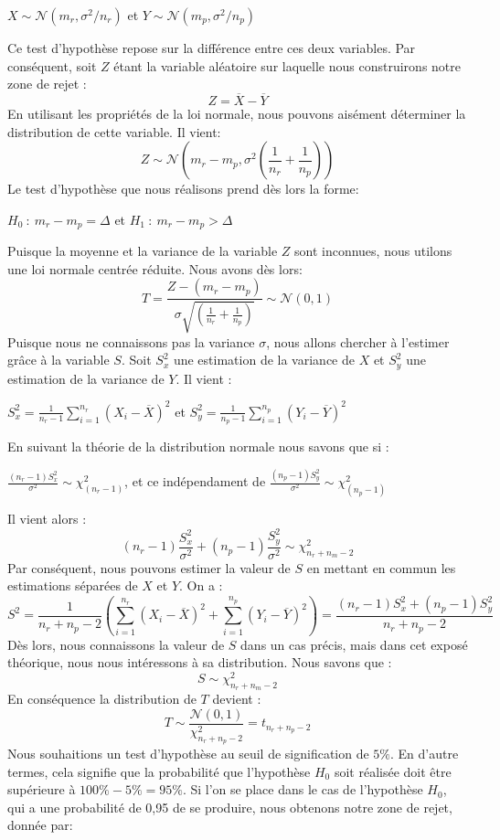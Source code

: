 \documentclass[a4paper, 11pt]{article}
\begin{document}
\begin{enumerate}[label=(\alph*)]
\begin{center}
    $X\sim\mathcal{N}(m_r,\sigma^2/n_r)$ et $Y\sim\mathcal{N}(m_p,\sigma^2/n_p)$
\end{center}
Ce test d'hypothèse repose sur la différence entre ces deux variables. Par conséquent, soit $Z$ étant la variable aléatoire sur laquelle nous construirons notre zone de rejet :
$$Z=\overline{X}-\overline{Y}$$
En utilisant les propriétés de la loi normale, nous pouvons aisément déterminer la distribution de cette variable. Il vient:
$$Z\sim\mathcal{N}(m_r-m_p,\sigma^2\left(\frac{1}{n_r}+\frac{1}{n_p}\right))$$
Le test d'hypothèse que nous réalisons prend dès lors la forme:
\begin{center}
    $H_0~:~m_r-m_p=\Delta$ et $H_1~:~m_r-m_p>\Delta$
\end{center}
Puisque la moyenne et la variance de la variable $Z$ sont inconnues, nous utilons une loi normale centrée réduite. Nous avons dès lors:
$$T=\frac{Z-(m_r-m_p)}{\sigma\sqrt{\left(\frac{1}{n_r}+\frac{1}{n_p}\right)}}\sim\mathcal{N}(0,1)$$
Puisque nous ne connaissons pas la variance $\sigma$, nous allons chercher à l'estimer grâce à la variable $S$. Soit $S^2_x$ une estimation de la variance de $X$ et $S^2_y$ une estimation de la variance de $Y$. Il vient :
\begin{center}
$S^2_x=\frac{1}{n_r-1}\sum_{i=1}^{n_r} (X_i-\overline{X})^2$ et $S^2_y=\frac{1}{n_p-1}\sum_{i=1}^{n_p} (Y_i-\overline{Y})^2$
\end{center}
\newpage
En suivant la théorie de la distribution normale nous savons que si :
\begin{center}
    $\frac{(n_r-1)S_x^2}{\sigma^2}\sim \chi_{(n_r-1)}^2$, et ce indépendament de $\frac{(n_p-1)S_y^2}{\sigma^2}\sim \chi_{(n_p-1)}^2$
\end{center}
Il vient alors :
$$(n_r-1)\frac{S^2_x}{\sigma^2}+ (n_p-1)\frac{S_y^2}{\sigma^2}\sim \chi^2_{n_r+n_m-2}$$
Par conséquent, nous pouvons estimer la valeur de $S$ en mettant en commun les estimations séparées de $X$ et $Y$. On a :
$$S^2=\frac{1}{n_r+n_p-2}\left(\sum^{n_r}_{i=1}(X_i-\overline{X})^2+\sum^{n_p}_{i=1}(Y_i-\overline{Y})^2\right)= \frac{(n_r-1)S^2_x+(n_p-1)S^2_y}{n_r+n_p-2}$$
Dès lors, nous connaissons la valeur de $S$ dans un cas précis, mais dans cet exposé théorique, nous nous intéressons à sa distribution. Nous savons que :
$$S\sim\chi^2_{n_r+n_m-2}$$
En conséquence la distribution de $T$ devient :
$$T\sim\frac{\mathcal{N}(0,1)}{\chi^2_{n_r+n_p-2}}=t_{n_r+n_p-2}$$
Nous souhaitions un test d'hypothèse au seuil de signification de $5\%$. En d'autre termes, cela signifie que la probabilité que l'hypothèse $H_0$ soit réalisée doit être supérieure à $100\%-5\%=95\%$. Si l'on se place dans le cas de l'hypothèse $H_0$, qui a une probabilité de 0,95 de se produire, nous obtenons notre zone de rejet, donnée par:

\end{enumerate}
\end{document}
